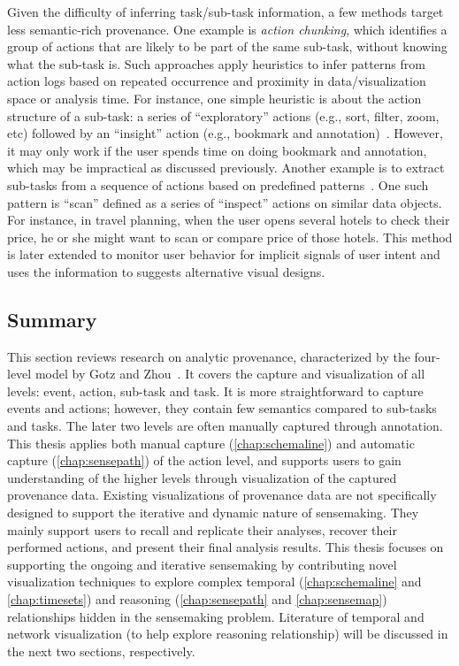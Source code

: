 Given the difficulty of inferring task/sub-task information, a few methods target less semantic-rich provenance. One example is \emph{action chunking}, which identifies a group of actions that are likely to be part of the same sub-task, without knowing what the sub-task is. Such approaches apply heuristics to infer patterns from action logs based on repeated occurrence and proximity in data/visualization space or analysis time. For instance, one simple heuristic is about the action structure of a sub-task: a series of ``exploratory'' actions (e.g., sort, filter, zoom, etc) followed by an ``insight'' action (e.g., bookmark and annotation)~\cite{Gotz2009}. However, it may only work if the user spends time on doing bookmark and annotation, which may be impractical as discussed previously. Another example is to extract sub-tasks from a sequence of actions based on predefined patterns~\cite{Gotz2009b}. One such pattern is ``scan'' defined as a series of ``inspect'' actions on similar data objects. For instance, in travel planning, when the user opens several hotels to check their price, he or she might want to scan or compare price of those hotels. This method is later extended to monitor user behavior for implicit signals of user intent and uses the information to suggests alternative visual designs.

\subsection{Summary}
This section reviews research on analytic provenance, characterized by the four-level model by Gotz and Zhou~\cite{Gotz2009}. It covers the capture and visualization of all levels: event, action, sub-task and task. It is more straightforward to capture events and actions; however, they contain few semantics compared to sub-tasks and tasks. The later two levels are often manually captured through annotation. This thesis applies both manual capture (\autoref{chap:schemaline}) and automatic capture  (\autoref{chap:sensepath}) of the action level, and supports users to gain understanding of the higher levels through visualization of the captured provenance data. Existing visualizations of provenance data are not specifically designed to support the iterative and dynamic nature of sensemaking. They mainly support users to recall and replicate their analyses, recover their performed actions, and present their final analysis results. This thesis focuses on supporting the ongoing and iterative sensemaking by contributing novel visualization techniques to explore complex temporal (\autoref{chap:schemaline} and \autoref{chap:timesets}) and reasoning (\autoref{chap:sensepath} and \autoref{chap:sensemap}) relationships hidden in the sensemaking problem. Literature of temporal and network visualization (to help explore reasoning relationship) will be discussed in the next two sections, respectively.